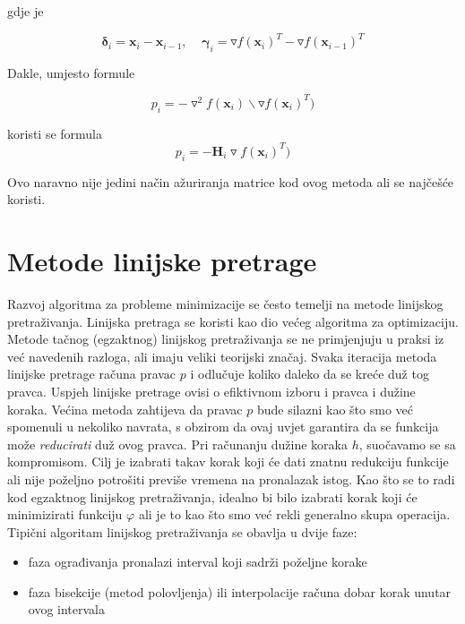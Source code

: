 \documentclass[bosnian,12pt,a4paper]{report}
\begin{document}
	gdje je
	
	$$\pmb{\delta}_i = \textbf{x}_i - \textbf{x}_{i-1}, ~~~~~ \pmb{\gamma}_i = \triangledown f(\textbf{x}_i)^T - \triangledown f(\textbf{x}_{i-1})^T$$
	
	
	\vspace{1cm}
	Dakle, umjesto formule 
	
	$$p_i = -\triangledown^2 f(\textbf{x}_i)\backslash \triangledown f(\textbf{x}_i)^T)$$ 
	
	koristi se formula 
	$$p_i = - \textbf{H}_i \triangledown f(\textbf{x}_i)^T)$$
	
	\vspace{1.25cm}
	Ovo naravno nije jedini način ažuriranja matrice kod ovog metoda ali se najčešće koristi.
	
	\vspace{1cm}
	\section{Metode linijske pretrage}
	Razvoj algoritma za probleme minimizacije se često temelji na metode linijskog pretraživanja. Linijska pretraga se koristi kao dio većeg algoritma za optimizaciju. Metode tačnog (egzaktnog) linijskog pretraživanja se ne primjenjuju u praksi iz već navedenih razloga, ali imaju veliki teorijski značaj. Svaka iteracija metoda linijske pretrage računa pravac $p$ i odlučuje koliko daleko da se kreće duž tog pravca. Uspjeh linijske pretrage ovisi o efiktivnom izboru i pravca i dužine koraka. Većina metoda zahtijeva da pravac $p$ bude silazni kao što smo već spomenuli u nekoliko navrata, s obzirom da ovaj uvjet garantira da se funkcija može \textit{reducirati} duž ovog pravca.
	\justify
	Pri računanju dužine koraka $h$, suočavamo se sa kompromisom. Cilj je izabrati takav korak koji će dati znatnu redukciju funkcije ali nije poželjno potrošiti previše vremena na pronalazak istog. Kao što se to radi kod egzaktnog linijskog pretraživanja, idealno bi bilo izabrati korak koji će minimizirati funkciju $\varphi$ ali je to kao što smo već rekli generalno skupa operacija. Tipični algoritam linijskog pretraživanja se obavlja u dvije faze:
	
	\begin{itemize}
	\item faza ograđivanja pronalazi interval koji sadrži poželjne korake
	\item faza bisekcije (metod polovljenja) ili interpolacije računa dobar korak unutar ovog intervala
	\end{itemize}
\end{document}
